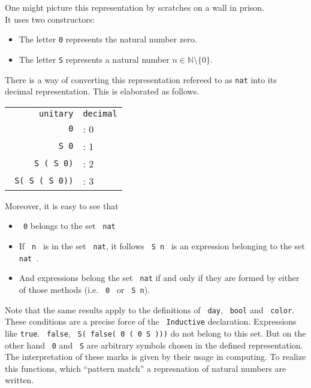   One might picture this representation by scratches on a wall in prison. \\
  It uses two constructors: 
  \begin{itemize}
  \item The letter \lstinline!0! represents the natural number zero. 
  \item The letter \lstinline!S! represents a natural number $n\in\mathbb{N}\setminus\{ 0\}$.  
  \end{itemize}
  There is a way of converting this representation refereed to as \lstinline!nat! into its decimal representation. This is elaborated as follows.
  \begin{example}
  
	  \begin{tabular} {r l}
	  
		  \texttt{unitary}				& \texttt{decimal}	\\
		  \texttt{\lstinline!0!} 		&: 0 				\\
		  \texttt{\lstinline! S 0!}  	&: 1				\\
		  \texttt{\lstinline! S ( S 0)!}	&: 2				\\
		  \texttt{\lstinline! S( S ( S 0))!}	&: 3				\\
		    
	  \end{tabular}
  \end{example}
  Moreover, it is easy to see that 
  \begin{itemize}
  \item \lstinline! 0! belongs to the set \lstinline! nat!
  \item  If \lstinline! n ! is in the set \lstinline! nat!, it follows \lstinline! S n ! is an expression belonging to the set \lstinline! nat !.
  \item And expressions belong the set \lstinline! nat! if and only if they are  formed by either of those methods (i.e. \lstinline! 0 ! or  \lstinline! S n!). 
  \end{itemize}
  
  
  Note that the same results apply to the definitions of \lstinline! day!, \lstinline! bool! and \lstinline! color!.
  These conditions are a precise force of the \lstinline! Inductive! declaration. Expressions like \lstinline!true!. \lstinline! false!, \lstinline! S( false( 0 ( 0 S )))! do not belong to this set.  
  But on the other hand \lstinline! 0! and \lstinline! S! are arbitrary symbols chosen in the defined representation. The interpretation of these marks is given by their usage in computing.
  To realize this functions, which ``pattern match'' a represnation of natural numbers are written.
  
